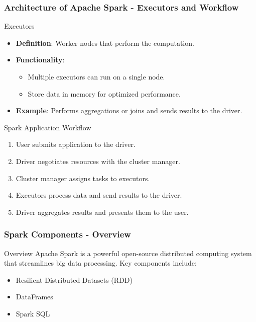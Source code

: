 \documentclass[aspectratio=169]{beamer}
\begin{document}
\begin{frame}[fragile]
    \frametitle{Architecture of Apache Spark - Executors and Workflow}
    \begin{block}{Executors}
        \begin{itemize}
            \item \textbf{Definition}: Worker nodes that perform the computation.
            \item \textbf{Functionality}:
                \begin{itemize}
                    \item Multiple executors can run on a single node.
                    \item Store data in memory for optimized performance.
                \end{itemize}
            \item \textbf{Example}: Performs aggregations or joins and sends results to the driver.
        \end{itemize}
    \end{block}
    
    \begin{block}{Spark Application Workflow}
        \begin{enumerate}
            \item User submits application to the driver.
            \item Driver negotiates resources with the cluster manager.
            \item Cluster manager assigns tasks to executors.
            \item Executors process data and send results to the driver.
            \item Driver aggregates results and presents them to the user.
        \end{enumerate}
    \end{block}
\end{frame}

\begin{frame}
    \frametitle{Spark Components - Overview}
    \begin{block}{Overview}
        Apache Spark is a powerful open-source distributed computing system that streamlines big data processing. Key components include:
        \begin{itemize}
            \item Resilient Distributed Datasets (RDD)
            \item DataFrames
            \item Spark SQL
        \end{itemize}
    \end{block}
\end{frame}
\end{document}
